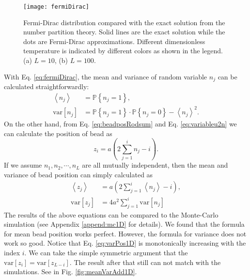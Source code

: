 \begin{figure}[htpb]
    \centering
    \texttt{[image: fermiDirac]}
    \caption{Fermi-Dirac distribution compared with the exact solution from the number partition theory. Solid lines are the exact solution while the dots are Fermi-Dirac approximations. Different dimensionless temperature is indicated by different colors as shown in the legend. (a) $L=10$, (b) $L=100$. }
    \label{fig:fermiDirac}
\end{figure}

With Eq. \eqref{eq:fermiDirac}, the mean and variance of random variable $n_j$ can be calculated straightforwardly:
\begin{subequations}
    \begin{align}
        \label{eq:nmean}
        \left<n_j\right> & = \mathbb{P}\left\{n_j=1\right\},\\
        \label{eq:nvar}
        \text{var}\left[n_j\right] & = \mathbb{P}\left\{n_j=1\right\} \cdot \mathbb{P}\left\{ n_j=0\right\} 
        - \left<n_j\right>^2.
    \end{align}
\end{subequations}
On the other hand, from Eq. \eqref{eq:beadposRodsum} and Eq. \eqref{eq:variableu2n} we can calculate the position of bead as
\begin{equation}
    \label{eq:beadpos1D}
    z_i = a\left(2\sum_{j=1}^i n_j - i\right).
\end{equation}
If we assume $n_1, n_2, \cdots, n_L$ are all mutually independent, then the mean and variance of bead position can simply calculated as
\begin{subequations}
    \label{eq:meanVarPos1D}
    \begin{align}
    \label{eq:meanPos1D}
        \left<z_j\right> & = a \left(2\sum_{j=1}^i \left<n_j\right> - i\right),\\
    \label{eq:varPos1D}
        \text{var}\left[z_j\right] & = 4a^2\sum_{j=1}^i\text{var}\left[n_j\right]
    \end{align}
\end{subequations}
The results of the above equations can be compared to the Monte-Carlo simulation (see Appendix \ref{append:mc1D} for details). 
We found that the formula for mean bead position works perfect. However, the formula for variance does not work so good. Notice that Eq. \eqref{eq:varPos1D} is monotonically increasing with the index $i$. We can take the simple symmetric argument that the $\text{var}\left[z_i\right] = \text{var}\left[z_{L-i}\right]$. The result after that still can not match with the simulations. See in Fig. \ref{fig:meanVarAdd1D}.

